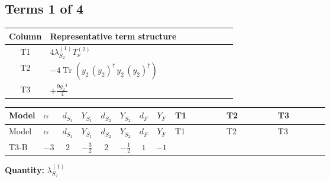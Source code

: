 \documentclass[8pt]{article}
\begin{document}
\begin{landscape}
\subsection*{Terms 1 of 4}
\begin{center}
\begin{tabular}{@{}c >{\raggedright\arraybackslash}p{0.82\linewidth}@{}}
\toprule
Column & Representative term structure \\
\midrule
T1 & \(\displaystyle 4 {\lambda_{S_2}^{(1)}} T_{\nu}^{(2)}\) \\
\midrule
T2 & \(\displaystyle -4 \operatorname{Tr}\!\left({y_2}\,\left({y_2}\right)^{\dagger}\,{y_2}\,\left({y_2}\right)^{\dagger}\right)\) \\
\midrule
T3 & \(\displaystyle +\frac{9 {g_2}^4}{4}\) \\
\midrule
\bottomrule
\end{tabular}
\end{center}
\smallskip
\tiny
\begin{longtable}{@{}llcccccc >{\raggedright\arraybackslash}p{0.21\linewidth} >{\raggedright\arraybackslash}p{0.21\linewidth} >{\raggedright\arraybackslash}p{0.21\linewidth}@{}}
\toprule
Model & $\alpha$ & $d_{S_1}$ & $Y_{S_1}$ & $d_{S_2}$ & $Y_{S_2}$ & $d_F$ & $Y_F$ & T1 & T2 & T3 \\
\midrule
\endfirsthead
\toprule
Model & $\alpha$ & $d_{S_1}$ & $Y_{S_1}$ & $d_{S_2}$ & $Y_{S_2}$ & $d_F$ & $Y_F$ & T1 & T2 & T3 \\
\midrule
\endhead
T3-B & $-3$ & $2$ & $-\frac{3}{2}$ & $2$ & $-\frac{1}{2}$ & $1$ & $-1$ & \scriptsize\adjustbox{max width=\linewidth}{$\begin{gathered} 4 {\lambda_{S_2}^{(1)}} T_{\nu}^{(2)}\end{gathered}$} & \scriptsize\adjustbox{max width=\linewidth}{$\begin{gathered} -4 \operatorname{Tr}\!\left({y_2}\,\left({y_2}\right)^{\dagger}\,{y_2}\,\left({y_2}\right)^{\dagger}\right)\end{gathered}$} & \scriptsize\adjustbox{max width=\linewidth}{$\begin{gathered} +\frac{9 {g_2}^4}{4}\end{gathered}$} \\
\midrule
\bottomrule
\end{longtable}
\clearpage
\noindent\textbf{Quantity: }$\lambda_{S_2}^{(1)}$\par\smallskip

\end{landscape}
\end{document}
